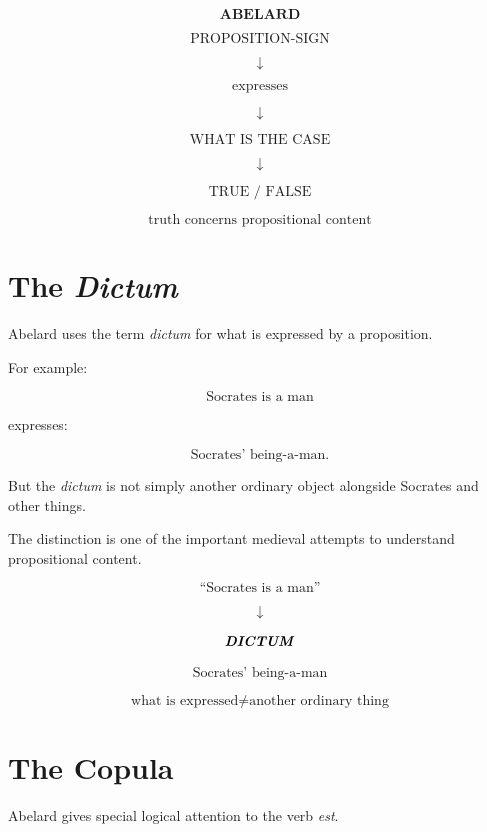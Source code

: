 \documentclass[11pt]{article}
\newcommand{\latin}[1]{\textit{#1}}
\begin{document}
\begin{whiteboard}
\[
\textbf{ABELARD}
\]

\[
\text{PROPOSITION-SIGN}
\]

\[
\downarrow
\]

\[
\text{expresses}
\]

\[
\downarrow
\]

\[
\text{WHAT IS THE CASE}
\]

\[
\downarrow
\]

\[
\text{TRUE / FALSE}
\]

\[
\boxed{\text{truth concerns propositional content}}
\]
\end{whiteboard}

\section{The \textit{Dictum}}

Abelard uses the term \latin{dictum} for what is expressed by a
proposition.

For example:

\[
\text{Socrates is a man}
\]

expresses:

\[
\text{Socrates' being-a-man.}
\]

But the \latin{dictum} is not simply another ordinary object
alongside Socrates and other things.

The distinction is one of the important medieval attempts to
understand propositional content.

\begin{whiteboard}
\[
\text{``Socrates is a man''}
\]

\[
\downarrow
\]

\[
\textbf{\latin{DICTUM}}
\]

\[
\text{Socrates' being-a-man}
\]

\[
\boxed{\text{what is expressed} \neq \text{another ordinary thing}}
\]
\end{whiteboard}

\section{The Copula}

Abelard gives special logical attention to the verb \latin{est}.
\end{document}

